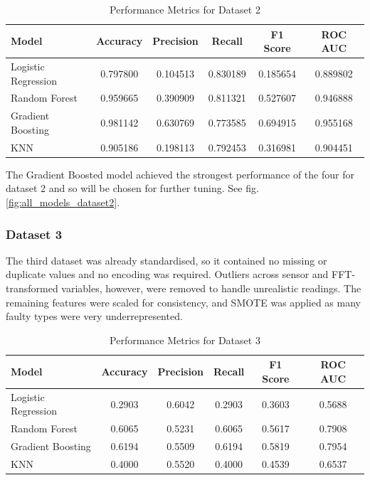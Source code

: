 \documentclass[11pt]{article}
\begin{document}
\begin{table}[h!]
\centering
\begin{tabular}{l c c c c c}
\hline
\textbf{Model} & \textbf{Accuracy} & \textbf{Precision} & \textbf{Recall} & \textbf{F1 Score} & \textbf{ROC AUC} \\ 
\hline
Logistic Regression & 0.797800 & 0.104513 & 0.830189 & 0.185654 & 0.889802 \\
Random Forest       & 0.959665 & 0.390909 & 0.811321 & 0.527607 & 0.946888 \\
Gradient Boosting   & 0.981142 & 0.630769 & 0.773585 & 0.694915 & 0.955168 \\
KNN                 & 0.905186 & 0.198113 & 0.792453 & 0.316981 & 0.904451 \\
\hline
\end{tabular}
\caption{Performance Metrics for Dataset 2}
\label{tab:model_performance2}
\end{table}

The Gradient Boosted model achieved the strongest performance of the four for dataset 2 and so will be chosen for further tuning. See fig.\ref{fig:all_models_dataset2}.

\subsubsection{Dataset 3}

The third dataset was already standardised, so it contained no missing or duplicate values and no encoding was required. Outliers across sensor and FFT-transformed variables, however, were removed to handle unrealistic readings. The remaining features were scaled for consistency, and SMOTE was applied as many faulty types were very underrepresented.


\begin{table}[h!]
\centering
\begin{tabular}{l c c c c c}
\hline
\textbf{Model} & \textbf{Accuracy} & \textbf{Precision} & \textbf{Recall} & \textbf{F1 Score} & \textbf{ROC AUC} \\ 
\hline
Logistic Regression & 0.2903 & 0.6042 & 0.2903 & 0.3603 & 0.5688 \\
Random Forest       & 0.6065 & 0.5231 & 0.6065 & 0.5617 & 0.7908 \\
Gradient Boosting   & 0.6194 & 0.5509 & 0.6194 & 0.5819 & 0.7954 \\
KNN                 & 0.4000 & 0.5520 & 0.4000 & 0.4539 & 0.6537 \\
\hline
\end{tabular}
\caption{Performance Metrics for Dataset 3}
\label{tab:model_performance3}
\end{table}
\end{document}
